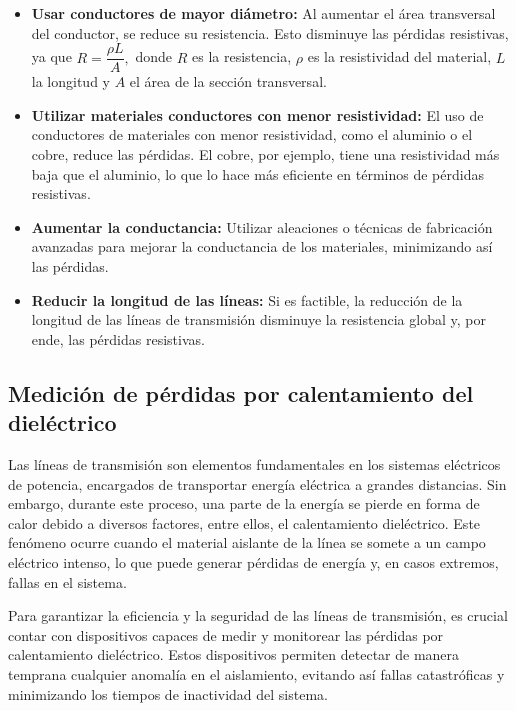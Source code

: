             \begin{itemize}
                \item \textbf{Usar conductores de mayor diámetro:} Al aumentar el área transversal del conductor, se reduce su resistencia. Esto disminuye las pérdidas resistivas, ya que $R = \dfrac{\rho L}{A},$ donde $R$ es la resistencia, $\rho$ es la resistividad del material, $L$ la longitud y $A$ el área de la sección transversal.

                \item \textbf{Utilizar materiales conductores con menor resistividad:} El uso de conductores de materiales con menor resistividad, como el aluminio o el cobre, reduce las pérdidas. El cobre, por ejemplo, tiene una resistividad más baja que el aluminio, lo que lo hace más eficiente en términos de pérdidas resistivas.

                \item \textbf{Aumentar la conductancia:}   Utilizar aleaciones o técnicas de fabricación avanzadas para mejorar la conductancia de los materiales, minimizando así las pérdidas.
                
                \item \textbf{Reducir la longitud de las líneas: }   Si es factible, la reducción de la longitud de las líneas de transmisión disminuye la resistencia global y, por ende, las pérdidas resistivas.
            \end{itemize}




            
    \subsection{Medición de pérdidas por calentamiento del dieléctrico}

        Las líneas de transmisión son elementos fundamentales en los sistemas eléctricos de potencia, encargados de transportar energía eléctrica a grandes distancias. Sin embargo, durante este proceso, una parte de la energía se pierde en forma de calor debido a diversos factores, entre ellos, el calentamiento dieléctrico. Este fenómeno ocurre cuando el material aislante de la línea se somete a un campo eléctrico intenso, lo que puede generar pérdidas de energía y, en casos extremos, fallas en el sistema.

        Para garantizar la eficiencia y la seguridad de las líneas de transmisión, es crucial contar con dispositivos capaces de medir y monitorear las pérdidas por calentamiento dieléctrico. Estos dispositivos permiten detectar de manera temprana cualquier anomalía en el aislamiento, evitando así fallas catastróficas y minimizando los tiempos de inactividad del sistema.

